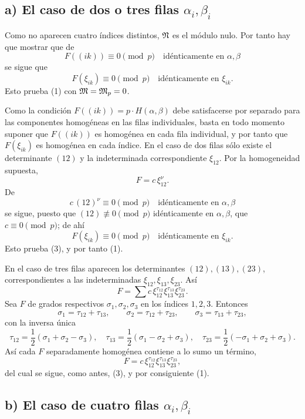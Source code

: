 \documentclass[11pt]{article}
\begin{document}
\subsection*{a) El caso de dos o tres filas \(\alpha_i,\beta_i\)}

Como no aparecen cuatro índices distintos, \(\mathfrak N\) es el módulo nulo. Por tanto hay que mostrar que de
\begin{equation}
        F((ik))\equiv0\pmod p\quad \text{idénticamente en \(\alpha,\beta\)}
\end{equation}
se sigue que
\[
        F(\xi_{ik})\equiv0\pmod p\quad \text{idénticamente en \(\xi_{ik}\)}.
\]
Esto prueba (1) con \(\mathfrak M=\mathfrak M_p=0\).

Como la condición \(F((ik))=p\cdot H(\alpha,\beta)\) debe satisfacerse por separado para las componentes homogéneas en las filas individuales, basta en todo momento suponer que \(F((ik))\) es homogénea en cada fila individual, y por tanto que \(F(\xi_{ik})\) es homogénea en cada índice. En el caso de dos filas sólo existe el determinante \((12)\) y la indeterminada correspondiente \(\xi_{12}\). Por la homogeneidad supuesta,
\[
        F=c\,\xi_{12}^\nu.
\]
De
\[
        c\,(12)^\nu\equiv0\pmod p\quad \text{idénticamente en \(\alpha,\beta\)}
\]
se sigue, puesto que \((12)\not\equiv0\pmod p\) idénticamente en \(\alpha,\beta\), que \(c\equiv0\pmod p\); de ahí
\[
        F(\xi_{ik})\equiv0\pmod p\quad \text{idénticamente en \(\xi_{ik}\)}.
\]
Esto prueba (3), y por tanto (1).

En el caso de tres filas aparecen los determinantes \((12),(13),(23)\), correspondientes a las indeterminadas \(\xi_{12},\xi_{13},\xi_{23}\). Así
\[
        F=\sum c\,\xi_{12}^{\tau_{12}}\xi_{13}^{\tau_{13}}\xi_{23}^{\tau_{23}}.
\]
Sea \(F\) de grados respectivos \(\sigma_1,\sigma_2,\sigma_3\) en los índices \(1,2,3\). Entonces
\[
        \sigma_1=\tau_{12}+\tau_{13},\qquad
        \sigma_2=\tau_{12}+\tau_{23},\qquad
        \sigma_3=\tau_{13}+\tau_{23},
\]
con la inversa única
\[
        \tau_{12}=\frac12(\sigma_1+\sigma_2-\sigma_3),\quad
        \tau_{13}=\frac12(\sigma_1-\sigma_2+\sigma_3),\quad
        \tau_{23}=\frac12(-\sigma_1+\sigma_2+\sigma_3).
\]
Así cada \(F\) separadamente homogénea contiene a lo sumo un término,
\[
        F=c\,\xi_{12}^{\tau_{12}}\xi_{13}^{\tau_{13}}\xi_{23}^{\tau_{23}},
\]
del cual se sigue, como antes, (3), y por consiguiente (1).

\subsection*{b) El caso de cuatro filas \(\alpha_i,\beta_i\)}
\end{document}
